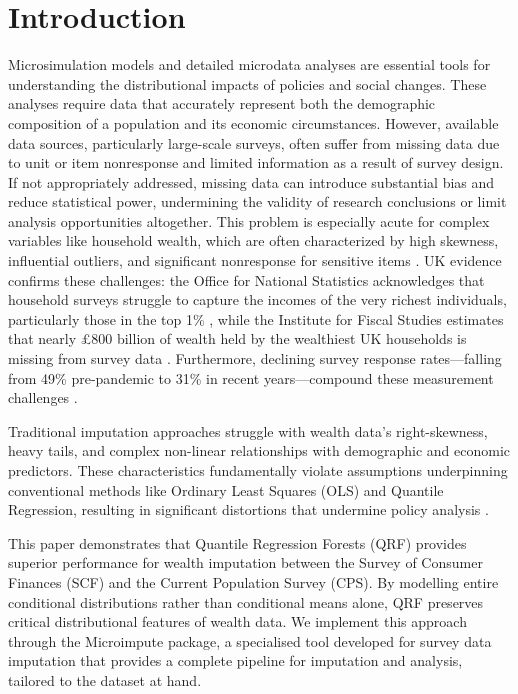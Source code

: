 \section{Introduction}

Microsimulation models and detailed microdata analyses are essential tools for understanding the distributional impacts of policies and social changes. These analyses require data that accurately represent both the demographic composition of a population and its economic circumstances. However, available data sources, particularly large-scale surveys, often suffer from missing data due to unit or item nonresponse \citep{dempster1983introduction} and limited information as a result of survey design. If not appropriately addressed, missing data can introduce substantial bias and reduce statistical power, undermining the validity of research conclusions \citep{graham2009missing} or limit analysis opportunities altogether. This problem is especially acute for complex variables like household wealth, which are often characterized by high skewness, influential outliers, and significant nonresponse for sensitive items \citep{barcelo2008impact}. UK evidence confirms these challenges: the Office for National Statistics acknowledges that household surveys struggle to capture the incomes of the very richest individuals, particularly those in the top 1\% \citep{ons2019using}, while the Institute for Fiscal Studies estimates that nearly £800 billion of wealth held by the wealthiest UK households is missing from survey data \citep{crawford2016distribution}. Furthermore, declining survey response rates—falling from 49\% pre-pandemic to 31\% in recent years—compound these measurement challenges \citep{ifs2025new}.

Traditional imputation approaches struggle with wealth data's right-skewness, heavy tails, and complex non-linear relationships with demographic and economic predictors. These characteristics fundamentally violate assumptions underpinning conventional methods like Ordinary Least Squares (OLS) and Quantile Regression, resulting in significant distortions that undermine policy analysis \citep{meinshausen2006quantile}.

This paper demonstrates that Quantile Regression Forests (QRF) provides superior performance for wealth imputation between the Survey of Consumer Finances (SCF) and the Current Population Survey (CPS). By modelling entire conditional distributions rather than conditional means alone, QRF preserves critical distributional features of wealth data. We implement this approach through the Microimpute package, a specialised tool developed for survey data imputation that provides a complete pipeline for imputation and analysis, tailored to the dataset at hand.

